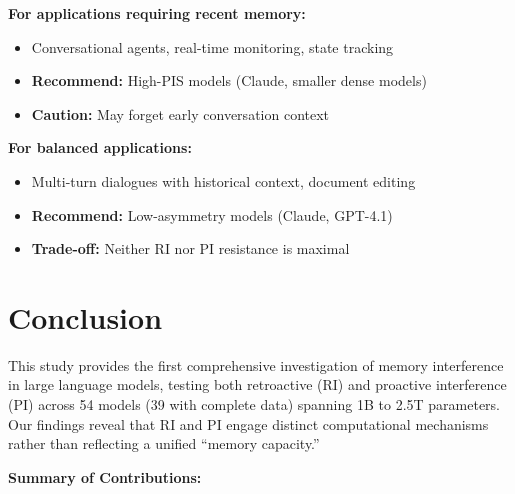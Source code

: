\documentclass{article}
\begin{document}
\textbf{For applications requiring recent memory:}
\begin{itemize}
    \item Conversational agents, real-time monitoring, state tracking
    \item \textbf{Recommend:} High-PIS models (Claude, smaller dense models)
    \item \textbf{Caution:} May forget early conversation context
\end{itemize}

\textbf{For balanced applications:}
\begin{itemize}
    \item Multi-turn dialogues with historical context, document editing
    \item \textbf{Recommend:} Low-asymmetry models (Claude, GPT-4.1)
    \item \textbf{Trade-off:} Neither RI nor PI resistance is maximal
\end{itemize}

\section{Conclusion}

This study provides the first comprehensive investigation of memory interference in large language models, testing both retroactive (RI) and proactive interference (PI) across 54 models (39 with complete data) spanning 1B to 2.5T parameters. Our findings reveal that RI and PI engage distinct computational mechanisms rather than reflecting a unified ``memory capacity.''

\textbf{Summary of Contributions:}
\end{document}

